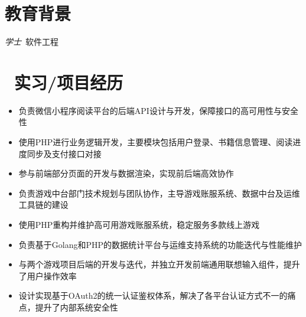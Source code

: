 \documentclass{resume}
\begin{document}


 
\section{\faGraduationCap  教育背景}
\textit{学士}\ 软件工程

\section{\faUsers\ 实习/项目经历}
\role{php后端开发}

\begin{itemize}
  \item 负责微信小程序阅读平台的后端API设计与开发，保障接口的高可用性与安全性
  \item 使用PHP进行业务逻辑开发，主要模块包括用户登录、书籍信息管理、阅读进度同步及支付接口对接
  \item 参与前端部分页面的开发与数据渲染，实现前后端高效协作
\end{itemize}



\begin{onehalfspacing}
\begin{itemize}
  \item 负责游戏中台部门技术规划与团队协作，主导游戏账服系统、数据中台及运维工具链的建设
  \item 使用PHP重构并维护高可用游戏账服系统，稳定服务多款线上游戏
  \item 负责基于Golang和PHP的数据统计平台与运维支持系统的功能迭代与性能维护
  \item 与两个游戏项目后端的开发与迭代，并独立开发前端通用联想输入组件，提升了用户操作效率
  \item 设计实现基于OAuth2的统一认证鉴权体系，解决了各平台认证方式不一的痛点，提升了内部系统安全性
\end{itemize}
\end{onehalfspacing}

\end{document}
